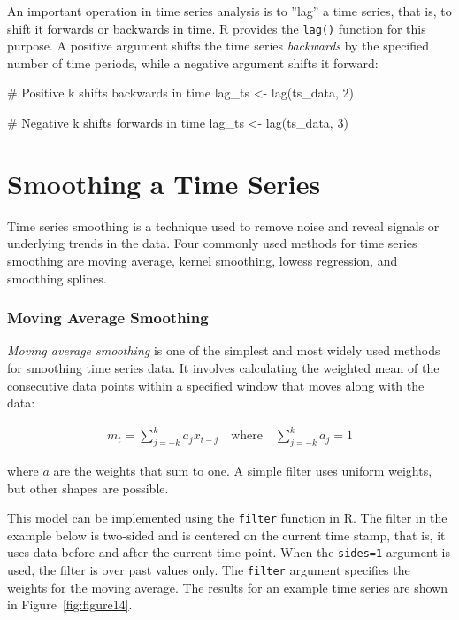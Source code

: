 An important operation in time series analysis is to ''lag'' a time series, that is, to shift it forwards or backwards in time. R provides the \texttt{lag()} function for this purpose. A positive argument shifts the time series \emph{backwards} by the specified number of time periods, while a negative argument shifts it forward:

\begin{Rcode}
# Positive k shifts backwards in time
lag_ts <- lag(ts_data, 2)

# Negative k shifts forwards in time
lag_ts <- lag(ts_data, 3)
\end{Rcode}

\section{Smoothing a Time Series}

Time series smoothing is a technique used to remove noise and reveal signals or underlying trends in the data. Four commonly used methods for time series smoothing are moving average, kernel smoothing, lowess regression, and smoothing splines. 

\subsubsection*{Moving Average Smoothing}

\emph{Moving average smoothing} is one of the simplest and most widely used methods for smoothing time series data. It involves calculating the weighted mean of the consecutive data points within a specified window that moves along with the data:

\begin{align*}m_t = \sum_{j=-k}^k a_j x_{t-j} \quad \text{where} \quad
\sum_{j=-k}^k a_j = 1
\end{align*}

\noindent where $a$ are the weights that sum to one. A simple filter uses uniform weights, but other shapes are possible.

This model can be implemented using the \texttt{filter} function in R. The filter in the example below is two-sided and is centered on the current time stamp, that is, it uses data before and after the current time point. When the \texttt{sides=1} argument is used, the filter is over past values only. The \texttt{filter} argument specifies the weights for the moving average. The results for an example time series are shown in Figure~\ref{fig:figure14}.


